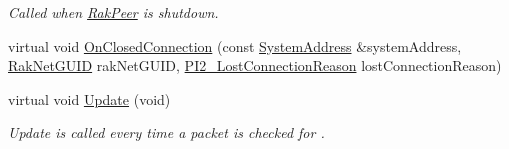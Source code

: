 \begin{DoxyCompactItemize}
\begin{DoxyCompactList}\small\item\em Called when \hyperlink{class_rak_net_1_1_rak_peer}{Rak\-Peer} is shutdown. \end{DoxyCompactList}\item 
virtual void \hyperlink{class_rak_net_1_1_file_list_transfer_a8636e4e2e29274a755495a5cee238a85}{On\-Closed\-Connection} (const \hyperlink{struct_rak_net_1_1_system_address}{System\-Address} \&system\-Address, \hyperlink{struct_rak_net_1_1_rak_net_g_u_i_d}{Rak\-Net\-G\-U\-I\-D} rak\-Net\-G\-U\-I\-D, \hyperlink{group___p_l_u_g_i_n___i_n_t_e_r_f_a_c_e___g_r_o_u_p_ga376cc546fd6892c2ead48cd51796c8b8}{P\-I2\-\_\-\-Lost\-Connection\-Reason} lost\-Connection\-Reason)
\item 
\hypertarget{class_rak_net_1_1_file_list_transfer_a552b65aef0df062b95748a29b823e9a4}{virtual void \hyperlink{class_rak_net_1_1_file_list_transfer_a552b65aef0df062b95748a29b823e9a4}{Update} (void)}\label{class_rak_net_1_1_file_list_transfer_a552b65aef0df062b95748a29b823e9a4}

\begin{DoxyCompactList}\small\item\em Update is called every time a packet is checked for . \end{DoxyCompactList}\end{DoxyCompactItemize}
